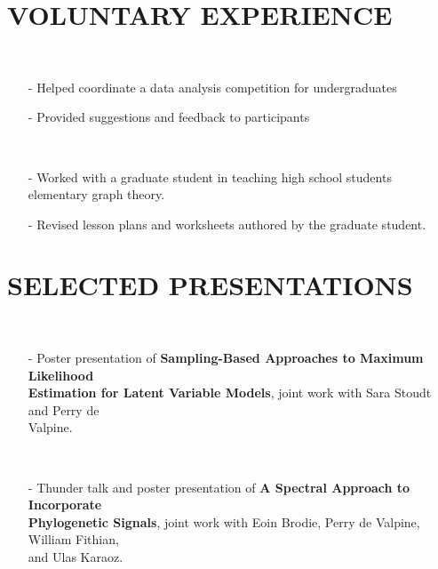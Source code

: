 \documentclass{res}
\begin{document}
\begin{resume}
\section{VOLUNTARY EXPERIENCE}   
  \\ 
    \begin{itemize}\setlength\itemsep{0em}
    \item[-] Helped coordinate a data analysis competition for undergraduates
    \item[-] Provided suggestions and feedback to participants
    \end{itemize}
     \\ 
    \begin{itemize}\setlength\itemsep{0em}
    \item[-]Worked with a graduate student in teaching high school students elementary graph theory.
    \item[-]Revised lesson plans and worksheets authored by the graduate student.
    \end{itemize}
    
\section{SELECTED PRESENTATIONS}
  \\ 
    \begin{itemize}\setlength\itemsep{0em}
    \item[-] Poster presentation of \textbf{Sampling-Based Approaches to Maximum Likelihood \\Estimation for Latent Variable Models}, joint work with Sara Stoudt and Perry de \\Valpine.
    \end{itemize}
    
  \\ 
    \begin{itemize}\setlength\itemsep{0em}
    \item[-] Thunder talk and poster presentation of \textbf{A Spectral Approach to Incorporate \\Phylogenetic Signals}, joint work with Eoin Brodie, Perry de Valpine, William Fithian,\\ and Ulas Karaoz.
    \end{itemize}
   

\end{resume}
\end{document}
